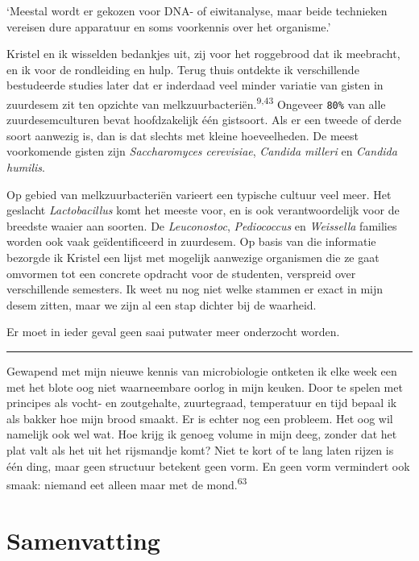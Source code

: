 \documentclass[
  11pt,
  dutch,
]{memoir}
\begin{document}
`Meestal wordt er gekozen voor DNA- of eiwitanalyse, maar beide
technieken vereisen dure apparatuur en soms voorkennis over het
organisme.'

Kristel en ik wisselden bedankjes uit, zij voor het roggebrood dat ik
meebracht, en ik voor de rondleiding en hulp. Terug thuis ontdekte ik
verschillende bestudeerde studies later dat er inderdaad veel minder
variatie van gisten in zuurdesem zit ten opzichte van
melkzuurbacteriën.\textsuperscript{9,43} Ongeveer \texttt{80\%} van alle
zuurdesemculturen bevat hoofdzakelijk één gistsoort. Als er een tweede
of derde soort aanwezig is, dan is dat slechts met kleine hoeveelheden.
De meest voorkomende gisten zijn \emph{Saccharomyces cerevisiae},
\emph{Candida milleri} en \emph{Candida humilis}.

Op gebied van melkzuurbacteriën varieert een typische cultuur veel meer.
Het geslacht \emph{Lactobacillus} komt het meeste voor, en is ook
verantwoordelijk voor de breedste waaier aan soorten. De
\emph{Leuconostoc}, \emph{Pediococcus} en \emph{Weissella} families
worden ook vaak geïdentificeerd in zuurdesem. Op basis van die
informatie bezorgde ik Kristel een lijst met mogelijk aanwezige
organismen die ze gaat omvormen tot een concrete opdracht voor de
studenten, verspreid over verschillende semesters. Ik weet nu nog niet
welke stammen er exact in mijn desem zitten, maar we zijn al een stap
dichter bij de waarheid.

Er moet in ieder geval geen saai putwater meer onderzocht worden.

\pfbreak

Gewapend met mijn nieuwe kennis van microbiologie ontketen ik elke week
een met het blote oog niet waarneembare oorlog in mijn keuken. Door te
spelen met principes als vocht- en zoutgehalte, zuurtegraad, temperatuur
en tijd bepaal ik als bakker hoe mijn brood smaakt. Er is echter nog een
probleem. Het oog wil namelijk ook wel wat. Hoe krijg ik genoeg volume
in mijn deeg, zonder dat het plat valt als het uit het rijsmandje komt?
Niet te kort of te lang laten rijzen is één ding, maar geen structuur
betekent geen vorm. En geen vorm vermindert ook smaak: niemand eet
alleen maar met de mond.\textsuperscript{63}

\newpage

\hypertarget{samenvatting}{%
\section{Samenvatting}\label{samenvatting}}
\end{document}

